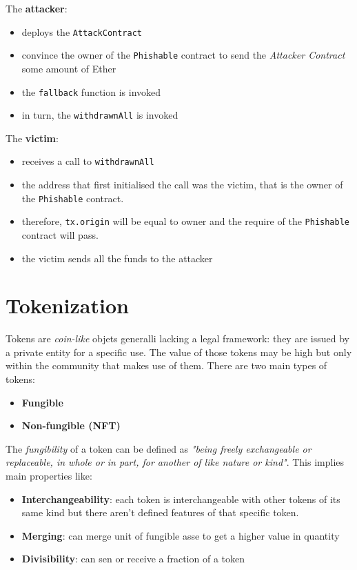 \documentclass[10pt,a4paper]{report}
\begin{document}
The \textbf{attacker}:
\begin{itemize}
	\item 
	deploys the \texttt{AttackContract}
	\item 
	convince the owner of the \texttt{Phishable} contract to send the \textit{Attacker Contract} some amount of Ether
	\item 
	the \texttt{fallback} function is invoked
	\item 
	in turn, the \texttt{withdrawnAll} is invoked
\end{itemize}

The \textbf{victim}:
\begin{itemize}
	\item 
	receives a call to \texttt{withdrawnAll}
	\item 
	the address that first initialised the call was the victim, that is the owner of the \texttt{Phishable} contract.
	\item 
	therefore, \texttt{tx.origin} will be equal to owner and the require of the \texttt{Phishable} contract will pass.
	\item 
	the victim sends all the funds to the attacker
\end{itemize}

\section{Tokenization}\label{sec:tokenization}
Tokens are \textit{coin-like} objets generalli lacking a legal framework: they are issued by a private entity for a specific use. The value of those tokens may be high but only within the community that makes use of them.
There are two main types of tokens:
\begin{itemize}
	\item 
	\textbf{Fungible}
	\item 
	\textbf{Non-fungible (NFT)}
\end{itemize}

The \textit{fungibility} of a token can be defined as \textit{"being freely exchangeable or replaceable, in whole or in part, for another of like nature or kind"}. This implies main properties like:
\begin{itemize}
	\item 
	\textbf{Interchangeability}: each token is interchangeable with other tokens of its same kind but there aren't defined features of that specific token.
	\item 
	\textbf{Merging}: can merge unit of fungible asse to get a higher value in quantity
	\item 
	\textbf{Divisibility}: can sen or receive a fraction of a token
\end{itemize}
\end{document}
